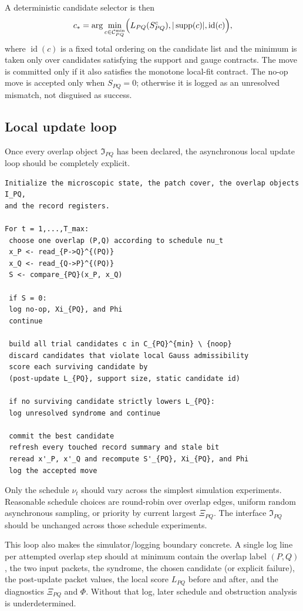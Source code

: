 \documentclass[11pt]{article}
\begin{document}
A deterministic candidate selector is then
\begin{equation}
c_{\ast}
=
\arg\min_{c\in\mathcal C^{\mathrm{min}}_{PQ}}
\Bigl(
L_{PQ}(S_{PQ}^{c}),
|\operatorname{supp}(c)|,
\operatorname{id}(c)
\Bigr),
\end{equation}
where $\operatorname{id}(c)$ is a fixed total ordering on the candidate list and the minimum is
taken only over candidates satisfying the support and gauge contracts. The move is committed
only if it also satisfies the monotone local-fit contract. The no-op move is accepted only when
$S_{PQ}=0$; otherwise it is logged as an unresolved mismatch, not disguised as success.

\subsection{Local update loop}

Once every overlap object $\mathfrak I_{PQ}$ has been declared, the asynchronous local update
loop should be completely explicit.

\begin{verbatim}
Initialize the microscopic state, the patch cover, the overlap objects I_PQ,
and the record registers.

For t = 1,...,T_max:
 choose one overlap (P,Q) according to schedule nu_t
 x_P <- read_{P->Q}^{(PQ)}
 x_Q <- read_{Q->P}^{(PQ)}
 S <- compare_{PQ}(x_P, x_Q)

 if S = 0:
 log no-op, Xi_{PQ}, and Phi
 continue

 build all trial candidates c in C_{PQ}^{min} \ {noop}
 discard candidates that violate local Gauss admissibility
 score each surviving candidate by
 (post-update L_{PQ}, support size, static candidate id)

 if no surviving candidate strictly lowers L_{PQ}:
 log unresolved syndrome and continue

 commit the best candidate
 refresh every touched record summary and stale bit
 reread x'_P, x'_Q and recompute S'_{PQ}, Xi_{PQ}, and Phi
 log the accepted move
\end{verbatim}

Only the schedule $\nu_t$ should vary across the simplest simulation experiments. Reasonable
schedule choices are round-robin over overlap edges, uniform random asynchronous sampling, or
priority by current largest $\Xi_{PQ}$. The interface $\mathfrak I_{PQ}$ should be
unchanged across those schedule experiments.

This loop also makes the simulator/logging boundary concrete. A single log line per attempted
overlap step should at minimum contain the overlap label $(P,Q)$, the two input packets, the
syndrome, the chosen candidate (or explicit failure), the post-update packet values, the local
score $L_{PQ}$ before and after, and the diagnostics $\Xi_{PQ}$ and $\Phi$. Without that log,
later schedule and obstruction analysis is underdetermined.
\end{document}
